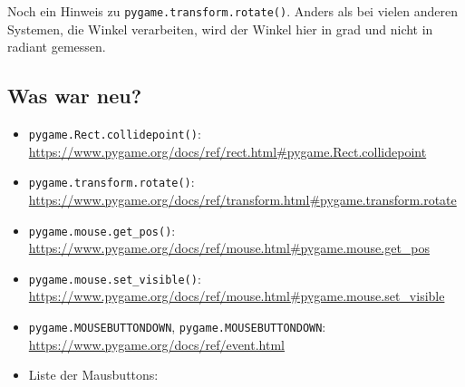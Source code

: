 
Noch ein Hinweis zu \texttt{pygame.transform.rotate()}. Anders als bei vielen anderen Systemen, die Winkel verarbeiten, wird der Winkel hier in \gls{grad} und nicht in \gls{radiant} gemessen.


\subsection*{Was war neu?}
\begin{itemize}
	\item \texttt{pygame.Rect.collidepoint()}:
\\ \url{https://www.pygame.org/docs/ref/rect.html#pygame.Rect.collidepoint}

	\item \texttt{pygame.transform.rotate()}:
\\ \url{https://www.pygame.org/docs/ref/transform.html#pygame.transform.rotate}

	\item \texttt{pygame.mouse.get\_pos()}:
\\ \url{https://www.pygame.org/docs/ref/mouse.html#pygame.mouse.get_pos}

	\item \texttt{pygame.mouse.set\_visible()}:
\\ \url{https://www.pygame.org/docs/ref/mouse.html#pygame.mouse.set_visible}

	\item \texttt{pygame.MOUSEBUTTONDOWN}, \texttt{pygame.MOUSEBUTTONDOWN}:
\\ \url{https://www.pygame.org/docs/ref/event.html}

	\item Liste der Mausbuttons: 
\end{itemize}


